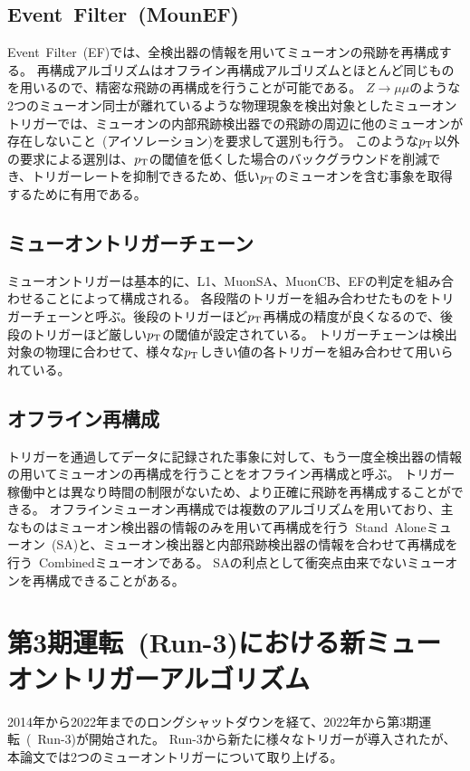 \subsection{Event~Filter~(MounEF)}\label{chapter3-2-4}
Event~Filter~(EF)では、全検出器の情報を用いてミューオンの飛跡を再構成する。
再構成アルゴリズムはオフライン再構成アルゴリズムとほとんど同じものを用いるので、精密な飛跡の再構成を行うことが可能である。
$Z\rightarrow\mu\mu$のような2つのミューオン同士が離れているような物理現象を検出対象としたミューオントリガーでは、ミューオンの内部飛跡検出器での飛跡の周辺に他のミューオンが存在しないこと~(アイソレーション)を要求して選別も行う。
このような$p_\mathrm{T}$以外の要求による選別は、$p_\mathrm{T}$の閾値を低くした場合のバックグラウンドを削減でき、トリガーレートを抑制できるため、低い$p_\mathrm{T}$のミューオンを含む事象を取得するために有用である。

\subsection{ミューオントリガーチェーン}\label{chapter3-2-5}
ミューオントリガーは基本的に、L1、MuonSA、MuonCB、EFの判定を組み合わせることによって構成される。
各段階のトリガーを組み合わせたものをトリガーチェーンと呼ぶ。後段のトリガーほど$p_\mathrm{T}$再構成の精度が良くなるので、後段のトリガーほど厳しい$p_\mathrm{T}$の閾値が設定されている。
トリガーチェーンは検出対象の物理に合わせて、様々な$p_\mathrm{T}$しきい値の各トリガーを組み合わせて用いられている。


\subsection{オフライン再構成}\label{chapter3-2-6}
トリガーを通過してデータに記録された事象に対して、もう一度全検出器の情報の用いてミューオンの再構成を行うことをオフライン再構成と呼ぶ。
トリガー稼働中とは異なり時間の制限がないため、より正確に飛跡を再構成することができる。
オフラインミューオン再構成では複数のアルゴリズムを用いており、主なものはミューオン検出器の情報のみを用いて再構成を行う~Stand~Aloneミューオン~(SA)と、ミューオン検出器と内部飛跡検出器の情報を合わせて再構成を行う~Combinedミューオンである。
SAの利点として衝突点由来でないミューオンを再構成できることがある。


\newpage

\section{第3期運転~(Run-3)における新ミューオントリガーアルゴリズム}\label{chapter3-3}
2014年から2022年までのロングシャットダウンを経て、2022年から第3期運転~(~Run-3)が開始された。
Run-3から新たに様々なトリガーが導入されたが、本論文では2つのミューオントリガーについて取り上げる。


